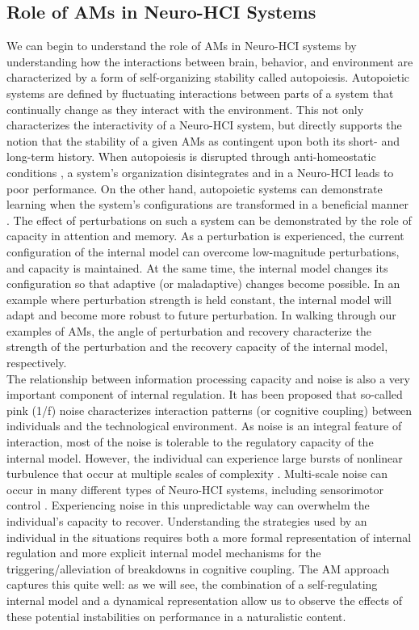 \documentclass{sigchi}
\begin{document}
\subsection{Role of AMs in Neuro-HCI Systems}
We can begin to understand the role of AMs in Neuro-HCI systems by understanding how the interactions between brain, behavior, and environment are characterized by a form of self-organizing stability called autopoiesis. Autopoietic systems \cite{maturana-varela} are defined by fluctuating interactions between parts of a system that continually change as they interact with the environment. This not only characterizes the interactivity of a Neuro-HCI system, but directly supports the notion that the stability of a given AMs as contingent upon both its short- and long-term history. When autopoiesis is disrupted through anti-homeostatic conditions \cite{valentinov}, a system's organization disintegrates and in a Neuro-HCI leads to poor performance. On the other hand, autopoietic systems can demonstrate learning when the system's configurations are transformed in a beneficial manner \cite{winograd-flores}. The effect of perturbations on such a system can be demonstrated by the role of capacity in attention and memory. As a perturbation is experienced, the current configuration of the internal model can overcome low-magnitude perturbations, and capacity is maintained. At the same time, the internal model changes its configuration so that adaptive (or maladaptive) changes become possible. In an example where perturbation strength is held constant, the internal model will adapt and become more robust to future perturbation. In walking through our examples of AMs, the angle of perturbation and recovery characterize the strength of the perturbation and the recovery capacity of the internal model, respectively.\\
The relationship between information processing capacity and noise is also a very important component of internal regulation. It has been proposed \cite{meacham-casanova} that so-called pink (1/f) noise characterizes interaction patterns (or cognitive coupling) between individuals and the technological environment. As noise is an integral feature of interaction, most of the noise is tolerable to the regulatory capacity of the internal model. However, the individual can experience large bursts of nonlinear turbulence that occur at multiple scales of complexity \cite{holden}. Multi-scale noise can occur in many different types of Neuro-HCI systems, including sensorimotor control \cite{bennett}. Experiencing noise in this unpredictable way can overwhelm the individual’s capacity to recover. Understanding the strategies used by an individual in the situations requires both a more formal representation of internal regulation and more explicit internal model mechanisms for the triggering/alleviation of breakdowns in cognitive coupling. The AM approach captures this quite well: as we will see, the combination of a self-regulating internal model and a dynamical representation allow us to observe the effects of these potential instabilities on performance in a naturalistic content.
\end{document}
